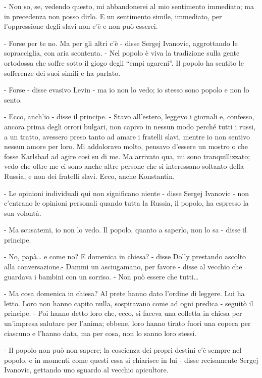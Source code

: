 - Non so, se, vedendo questo, mi abbandonerei al mio sentimento immediato; ma in precedenza non posso dirlo. E un sentimento simile, immediato, per l'oppressione degli slavi non c'è e non può esserci. 

- Forse per te no. Ma per gli altri c'è - disse Sergej Ivanovic, aggrottando le sopracciglia, con aria scontenta. - Nel popolo è viva la tradizione sulla gente ortodossa che soffre sotto il giogo degli ``empi agareni''. Il popolo ha sentito le sofferenze dei suoi simili e ha parlato. 

- Forse - disse evasivo Levin - ma io non lo vedo; io stesso sono popolo e non lo sento. 

- Ecco, anch'io - disse il principe. - Stavo all'estero, leggevo i giornali e, confesso, ancora prima degli orrori bulgari, non capivo in nessun modo perché tutti i russi, a un tratto, avessero preso tanto ad amare i fratelli slavi, mentre io non sentivo nessun amore per loro. Mi addoloravo molto, pensavo d'essere un mostro o che fosse Karlsbad ad agire così su di me. Ma arrivato qua, mi sono tranquillizzato; vedo che oltre me ci sono anche altre persone che si interessano soltanto della Russia, e non dei fratelli slavi. Ecco, anche Konstantin. 

- Le opinioni individuali qui non significano niente - disse Sergej Ivanovic - non c'entrano le opinioni personali quando tutta la Russia, il popolo, ha espresso la sua volontà. 

- Ma scusatemi, io non lo vedo. Il popolo, quanto a saperlo, non lo sa - disse il principe. 

- No, papà\ldots{} e come no? E domenica in chiesa? - disse Dolly prestando ascolto alla conversazione.- Dammi un asciugamano, per favore - disse al vecchio che guardava i bambini con un sorriso. - Non può essere che tutti\ldots{} 

- Ma cosa domenica in chiesa? Al prete hanno dato l'ordine di leggere. Lui ha letto. Loro non hanno capito nulla, sospiravano come ad ogni predica - seguitò il principe. - Poi hanno detto loro che, ecco, si faceva una colletta in chiesa per un'impresa salutare per l'anima; ebbene, loro hanno tirato fuori una copeca per ciascuno e l'hanno data, ma per cosa, non lo sanno loro stessi. 

- Il popolo non può non sapere; la coscienza dei propri destini c'è sempre nel popolo, e in momenti come questi essa si chiarisce in lui - disse recisamente Sergej Ivanovic, gettando uno sguardo al vecchio apicultore. 

